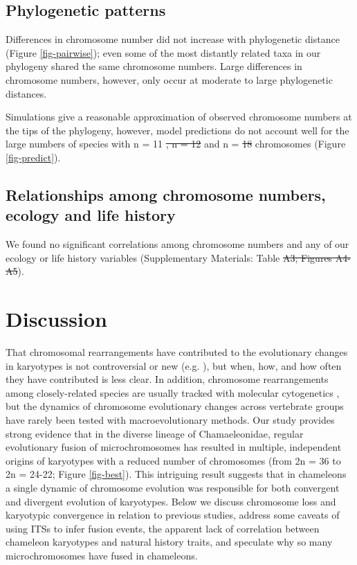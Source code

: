 \documentclass[a4paper, 12pt]{article}
\providecommand{\DIFadd}[1]{{\protect\color{blue}\uwave{#1}}} %
\providecommand{\DIFdel}[1]{{\protect\color{red}\sout{#1}}}                      %
\providecommand{\DIFaddbegin}{} %
\providecommand{\DIFaddend}{} %
\providecommand{\DIFdelbegin}{} %
\providecommand{\DIFdelend}{} %
\newcommand{\DIFscaledelfig}{0.5}
\newlength{\DIFdelgraphicswidth} %
\newlength{\DIFdelgraphicsheight} %
\newcommand{\DIFaddincludegraphics}[2][]{{\color{blue}\fbox{\DIFOincludegraphics[#1]{#2}}}} %
\newcommand{\DIFdelincludegraphics}[2][]{%
\sbox{\DIFdelgraphicsbox}{\DIFOincludegraphics[#1]{#2}}%
\settoboxwidth{\DIFdelgraphicswidth}{\DIFdelgraphicsbox} %
\settoboxtotalheight{\DIFdelgraphicsheight}{\DIFdelgraphicsbox} %
\scalebox{\DIFscaledelfig}{%
\parbox[b]{\DIFdelgraphicswidth}{\usebox{\DIFdelgraphicsbox}\\[-\baselineskip] \rule{\DIFdelgraphicswidth}{0em}}\llap{\resizebox{\DIFdelgraphicswidth}{\DIFdelgraphicsheight}{%
\setlength{\unitlength}{\DIFdelgraphicswidth}%
\begin{picture}(1,1)%
\thicklines\linethickness{2pt} %
{\color[rgb]{1,0,0}\put(0,0){\framebox(1,1){}}}%
{\color[rgb]{1,0,0}\put(0,0){\line( 1,1){1}}}%
{\color[rgb]{1,0,0}\put(0,1){\line(1,-1){1}}}%
\end{picture}%
}\hspace*{3pt}}} %
} %
\DeclareRobustCommand{\DIFaddbegin}{\DIFOaddbegin \let\includegraphics\DIFaddincludegraphics} %
\DeclareRobustCommand{\DIFaddend}{\DIFOaddend \let\includegraphics\DIFOincludegraphics} %
\DeclareRobustCommand{\DIFdelbegin}{\DIFOdelbegin \let\includegraphics\DIFdelincludegraphics} %
\DeclareRobustCommand{\DIFdelend}{\DIFOaddend \let\includegraphics\DIFOincludegraphics} %
\begin{document}
\subsection{Phylogenetic patterns}
Differences in chromosome number did not increase with phylogenetic distance (Figure \ref{fig-pairwise}); even some of the most distantly related taxa in our phylogeny shared the same chromosome numbers. 
Large differences in chromosome numbers, however, only occur at moderate to large phylogenetic distances. 

Simulations give a reasonable approximation of observed chromosome numbers at the tips of the phylogeny, however, model predictions do not account well for the large numbers of species with n = 11 \DIFdelbegin \DIFdel{, n = 12 }\DIFdelend and n = \DIFdelbegin \DIFdel{18 }\DIFdelend \DIFaddbegin \DIFadd{12 }\DIFaddend chromosomes (Figure \ref{fig-predict}).

\subsection{Relationships among chromosome numbers, ecology and life history}
We found no significant correlations among chromosome numbers and any of our ecology or life history variables (Supplementary Materials: Table \DIFdelbegin \DIFdel{A3; Figures A4-A5}\DIFdelend \DIFaddbegin \DIFadd{A4; Figures A8 and A9}\DIFaddend ). 

\section{Discussion}

That chromosomal rearrangements have contributed to the evolutionary changes in karyotypes is not controversial or new (e.g. \citealt{deakin2016anchoring}), but when, how, and how often they have contributed is less clear. 
In addition, chromosome rearrangements among closely-related species are usually tracked with molecular cytogenetics \citep{lisachov2021whole}, but the dynamics of chromosome evolutionary changes across vertebrate groups have rarely been tested with macroevolutionary methods. 
Our study provides strong evidence that in the diverse lineage of Chamaeleonidae, regular evolutionary fusion of microchromosomes has resulted in multiple, independent origins of karyotypes with a reduced number of chromosomes (from 2n = 36 to 2n = 24-22; Figure \ref{fig-best}). 
This intriguing result suggests that in chameleons a single dynamic of chromosome evolution was responsible for both convergent and divergent evolution of karyotypes. 
Below we discuss chromosome loss and karyotypic convergence in relation to previous studies, address some caveats of using ITSs to infer fusion events, the apparent lack of correlation between chameleon karyotypes and natural history traits, and speculate why so many microchromosomes have fused in chameleons.    
\end{document}
